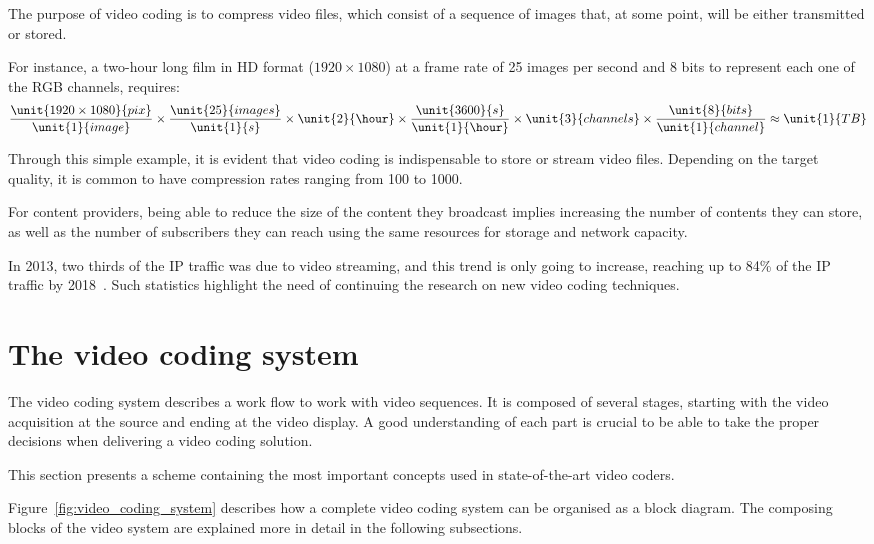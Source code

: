 \documentclass[11pt,a4paper,openright,twoside]{book}
\numberwithin{equation}{section} %
\numberwithin{figure}{section} %
\numberwithin{table}{section} %
\begin{document}
The purpose of video coding is to compress video files, which consist of
a sequence of images that, at some point, will be either transmitted or
stored.

For instance, a two-hour long film in \ac{HD} format ($1920 \times 1080$)
at a frame rate of 25 images per second and 8 bits to represent each one
of the \ac{RGB} channels, requires:
\[
	\frac{\unit{1920\times1080}{pix}}{\unit{1}{image}}
	\times \frac{\unit{25}{images}}{\unit{1}{s}}
	\times \unit{2}{\hour} \times \frac{\unit{3600}{s}}{\unit{1}{\hour}}
	\times \unit{3}{channels} \times \frac{\unit{8}{bits}}{\unit{1}{channel}}
	\approx \unit{1}{TB}
\]

Through this simple example, it is evident that video coding is
indispensable to store or stream video files.
Depending on the target quality, it is common to have compression rates
ranging from 100 to 1000.

For content providers, being able to reduce the size of the content they
broadcast implies increasing the number of contents they can store, as
well as the number of subscribers they can reach using the same
resources for storage and network capacity.

In 2013, two thirds of the \ac{IP} traffic was due to video
streaming, and this trend is only going to increase, reaching up to 84\%
of the \acs{IP} traffic by 2018~\cite{cisco-13-vni-forecast}.
Such statistics highlight the need of continuing the research on
new video coding techniques.

\section{The video coding system}
\label{sec:the_video_coding_system}

The video coding system describes a work flow to work with video
sequences.
It is composed of several stages, starting with the video acquisition at
the source and ending at the video display.
A good understanding of each part is crucial to be able to take the
proper decisions when delivering a video coding solution.

This section presents a scheme containing the most important concepts
used in state-of-the-art video coders.

Figure~\ref{fig:video_coding_system} describes how a complete video
coding system can be organised as a block diagram.
The composing blocks of the video system are explained more in detail in
the following subsections.
\end{document}
